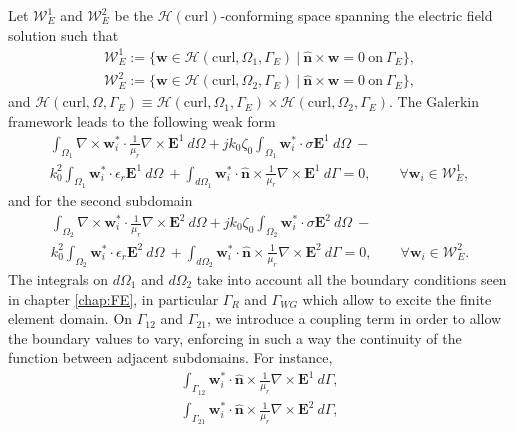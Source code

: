Let $\mathcal{W}_E^1$ and $\mathcal{W}_E^2$ be the $\mathcal{H}(\mathrm{curl})$-conforming space spanning the electric field solution such that
\begin{gather*}
\mathcal{W}_E^1 := \{ \mathbf{w} \in \mathcal{H}(\mathrm{curl},\Omega_1, \Gamma_E) \ | \ \hat{\mathbf{n}} \times \mathbf{w} = 0 \ \mathrm{on} \ \Gamma_E \},\\
\mathcal{W}_E^2 := \{ \mathbf{w} \in \mathcal{H}(\mathrm{curl},\Omega_2, \Gamma_E) \ | \ \hat{\mathbf{n}} \times \mathbf{w} = 0 \ \mathrm{on} \ \Gamma_E \},
\end{gather*}
%
\noindent and $\mathcal{H}(\mathrm{curl},\Omega, \Gamma_E) \equiv \mathcal{H}(\mathrm{curl},\Omega_1, \Gamma_E) \times \mathcal{H}(\mathrm{curl},\Omega_2, \Gamma_E)$. The Galerkin framework leads to the following weak form
%
\begin{multline}
\label{eq:FETIform1}
\int_{\Omega_1} \nabla \times \mathbf{w}_i^* \cdot \frac{1}{\mu_r} \nabla \times \mathbf{E}^1 \ d\Omega +
 j k_0 \zeta_0 \int_{\Omega_1} \mathbf{w}_i^* \cdot \sigma \mathbf{E}^1 \ d\Omega \ - \\
 k_0^2 \int_{\Omega_1} \mathbf{w}_i^* \cdot \epsilon_r \mathbf{E}^1 \ d\Omega \ + \int_{d\Omega_1} \mathbf{w}_i^* \cdot \hat{\mathbf{n}} \times \frac{1}{\mu_r} \nabla \times {\mathbf{E}^1}  \ d\Gamma = 0, 
\qquad \forall \mathbf{w}_i \in \mathcal{W}_E^1,
\end{multline}
\noindent and for the second subdomain
\begin{multline}
\label{eq:FETIform2}
\int_{\Omega_2} \nabla \times \mathbf{w}_i^* \cdot \frac{1}{\mu_r} \nabla \times \mathbf{E}^2 \ d\Omega +
 j k_0 \zeta_0 \int_{\Omega_2} \mathbf{w}_i^* \cdot \sigma \mathbf{E}^2 \ d\Omega \ - \\
 k_0^2 \int_{\Omega_2} \mathbf{w}_i^* \cdot \epsilon_r \mathbf{E}^2 \ d\Omega \ + \int_{d\Omega_2} \mathbf{w}_i^* \cdot \hat{\mathbf{n}} \times \frac{1}{\mu_r} \nabla \times {\mathbf{E}^2}  \ d\Gamma = 0, 
\qquad \forall \mathbf{w}_i \in \mathcal{W}_E^2.
\end{multline}
%
\noindent The integrals on $d\Omega_1$ and $d\Omega_2$ take into account all the  boundary conditions seen in chapter \ref{chap:FE}, in particular $\Gamma_R$ and $\Gamma_{WG}$ which allow to excite the finite element domain. On $\Gamma_{12}$ and $\Gamma_{21}$, we introduce a coupling term in order to allow the boundary values to vary, enforcing in such a way the continuity of the function between adjacent subdomains. For instance,
\begin{gather}
\int_{\Gamma_{12}} \mathbf{w}_i^* \cdot \hat{\mathbf{n}} \times \frac{1}{\mu_r} \nabla \times {\mathbf{E}^1}  \ d\Gamma,\label{eq:j1}\\
\int_{\Gamma_{21}} \mathbf{w}_i^* \cdot \hat{\mathbf{n}} \times \frac{1}{\mu_r} \nabla \times {\mathbf{E}^2}  \ d\Gamma,\label{eq:j2}
\end{gather}
